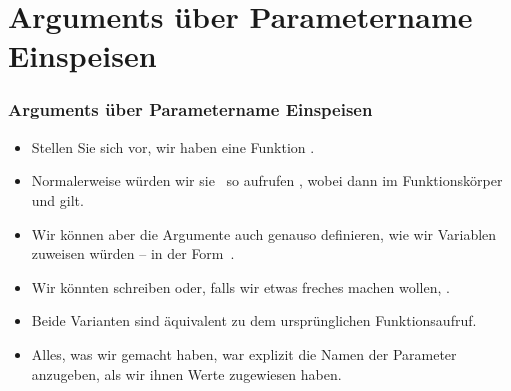 \documentclass[aspectratio=169,mathserif,notheorems]{beamer}%
\begin{document}
\section{Arguments über Parametername Einspeisen}%
%
\begin{frame}%
\frametitle{Arguments über Parametername Einspeisen}%
\begin{itemize}%
\item Stellen Sie sich vor, wir haben eine Funktion .%
%
\item<2-> Normalerweise würden wir sie \DEzB\ so aufrufen , wobei dann im Funktionskörper   und  gilt.%
%
\item<3-> Wir können aber die Argumente auch genauso definieren, wie wir Variablen zuweisen würden -- in der Form~.%
%
\item<4-> Wir könnten schreiben  oder, falls wir etwas freches machen wollen, .%
%
\item<5-> Beide Varianten sind äquivalent zu dem ursprünglichen Funktionsaufruf.%
%
\item<6-> Alles, was wir gemacht haben, war explizit die Namen der Parameter anzugeben, als wir ihnen Werte zugewiesen haben.%
\end{itemize}%
\end{frame}
%
\end{document}
